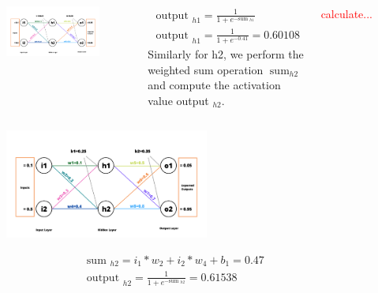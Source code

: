 \documentclass[8pt,dvipsnames]{beamer}
\begin{document}
\begin{frame}
	\begin{columns}
		\begin{figure}
			\centering
			\includegraphics[width=\textwidth]{imgs/nn_2.png}
		\end{figure}
			$$
		\begin{array}{c}\text { output }_{h 1}=\frac{1}{1+e^{- \text {sum }_{h 1}}} \\ \text { output }_{h 1}=\frac{1}{1+e^{-0.41}}=0.60108\end{array}
		$$
		Similarly for h2, we perform the weighted sum operation \(\operatorname{sum}_{h 2}\) and compute the activation value output \({ }_{h 2}\).
		
		\centering
		\textcolor{red}{calculate...}
	\end{columns}
\end{frame}

\begin{frame}
	\begin{figure}
		\centering
		\includegraphics[width=0.6\textwidth]{imgs/nn_2.png}
	\end{figure}
	$$
	\begin{array}{c}\text { sum }_{h 2}=i_{1} * w_{2}+i_{2} * w_{4}+b_{1}=0.47 \\ \text { output }_{h 2}=\frac{1}{1+e^{- \text {sum }_{h 2}}}=0.61538\end{array}
	$$
\end{frame}
\end{document}
